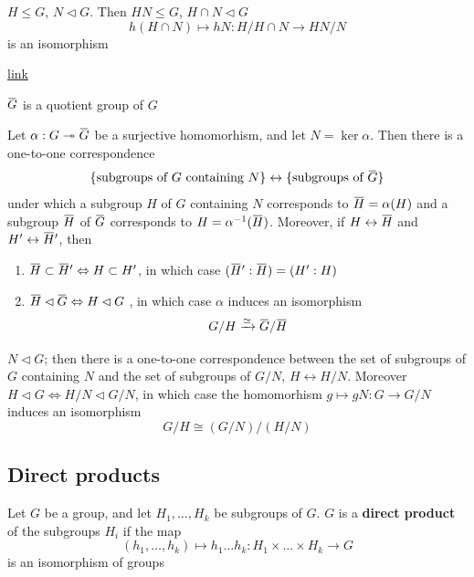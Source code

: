 \documentclass[11pt]{article}
\begin{document}
\begin{theorem}
\(H\le G\), \(N\lhd G\). Then \(HN\le G\), \(H\cap N\lhd G\)
\begin{equation*}
h(H\cap N)\mapsto hN:H/H\cap N\to HN/ N
\end{equation*}
is an isomorphism
\end{theorem}

\href{https://math.stackexchange.com/questions/3122468/is-hn-n-equal-to-h-n}{link}

\(\barG\) is a quotient group of \(G\)
\begin{theorem}
\label{1.47}
Let \(\alpha:G\twoheadrightarrow\barG\) be a surjective homomorhism, and let \(N=\ker\alpha\). Then there is a one-to-one
correspondence
\begin{equation*}
\{\text{subgroups of $G$ containing $N$}\}\leftrightarrow\{\text{subgroups of $\barG$}\}
\end{equation*}
under which a subgroup \(H\) of \(G\) containing \(N\) corresponds to \(\barH=\alpha(H)\) and a
subgroup \(\barH\) of \(\barG\) corresponds to \(H=\alpha^{-1}(\barH)\). Moreover, if \(H\leftrightarrow\barH\)
and \(H'\leftrightarrow\barH'\), then
\begin{enumerate}
\item \(\barH\subset\barH'\Leftrightarrow H\subset H'\), in which case \((\barH':\barH)=(H':H)\)
\item \(\barH\lhd\barG\Leftrightarrow H\lhd G\) , in which case \(\alpha\) induces an isomorphism
\begin{equation*}
G/H\xrightarrow{\simeq}\barG/\barH
\end{equation*}
\end{enumerate}
\end{theorem}

\begin{corollary}[]
\(N\lhd G\); then there is a one-to-one correspondence between the set of subgroups of \(G\)
containing \(N\) and the set of subgroups of \(G/N\), \(H\leftrightarrow H/N\).
Moreover \(H\lhd G\Leftrightarrow H/N\lhd G/N\), in which case the homomorhism \(g\mapsto gN:G\to G/N\) induces an
isomorphism
\begin{equation*}
G/H\cong(G/N)/(H/N)
\end{equation*}
\end{corollary}
\subsection{Direct products}
\label{sec:orge04187e}
Let \(G\) be a group, and let \(H_1,\dots,H_k\) be subgroups of \(G\). \(G\) is a \textbf{direct product} of
the subgroups \(H_i\) if the map
\begin{equation*}
(h_1,\dots,h_k)\mapsto h_1\dots h_k:H_1\times\dots\times H_k\to G
\end{equation*}
is an isomorphism of groups
\end{document}
